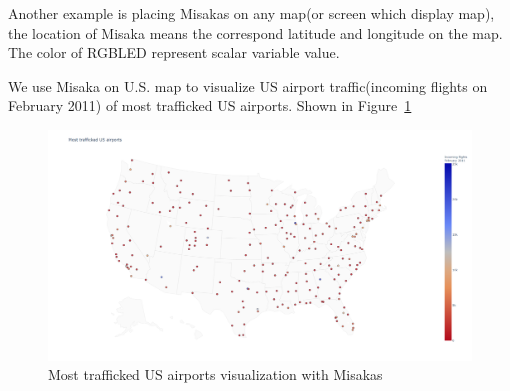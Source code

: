 \documentclass[conference]{IEEEtran}
\begin{document}
Another example is placing Misakas on any map(or screen which display map), the location of Misaka means the correspond latitude and longitude on the map. The color of RGBLED represent scalar variable value.

We use Misaka on U.S. map to visualize US airport traffic(incoming flights on February 2011) of most trafficked US airports. Shown in Figure~\ref{fig:scatterplots2}

\begin{figure}[htbp]
    \centering
    \includegraphics[width=\columnwidth]{scatterplots2.png}
    \caption{Most trafficked US airports visualization with Misakas}
    \label{fig:scatterplots2}
\end{figure}











\end{document}

